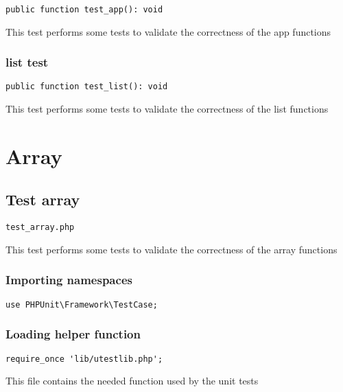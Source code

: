 \documentclass[a4paper]{article}
\begin{document}
\begin{lstlisting}
public function test_app(): void
\end{lstlisting}

This test performs some tests to validate the correctness
of the app functions

\hypertarget{toc37}{}
\subsubsection{list test}

\begin{lstlisting}
public function test_list(): void
\end{lstlisting}

This test performs some tests to validate the correctness
of the list functions


\hypertarget{toc38}{}
\section{Array}

\hypertarget{toc39}{}
\subsection{Test array}

\begin{lstlisting}
test_array.php
\end{lstlisting}

This test performs some tests to validate the correctness
of the array functions

\hypertarget{toc40}{}
\subsubsection{Importing namespaces}

\begin{lstlisting}
use PHPUnit\Framework\TestCase;
\end{lstlisting}

\hypertarget{toc41}{}
\subsubsection{Loading helper function}

\begin{lstlisting}
require_once 'lib/utestlib.php';
\end{lstlisting}

This file contains the needed function used by the unit tests
\end{document}
